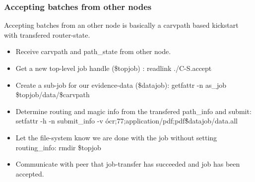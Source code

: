 \subsubsection{Accepting batches from other nodes}
Accepting batches from an other node is basically a carvpath based kickstart with transfered router-state.
\begin{itemize}
\item Receive carvpath and path\_state from other node.
\item Get a new top-level job handle (\$topjob) : readlink \@./C-S.accept
\item Create a sub-job for our evidence-data (\$datajob): getfattr -n as\_job \$topjob/data/\$carvpath
\item Determine routing and magic info from the transfered path\_info and submit: setfattr -h -n submit\_info -v \'ocr;77;application/pdf;pdf\' \$datajob/data.all
\item Let the file-system know we are done with the job without setting routing\_info: rmdir \$topjob
\item Communicate with peer that job-transfer has succeeded and job has been accepted.
\end{itemize}
